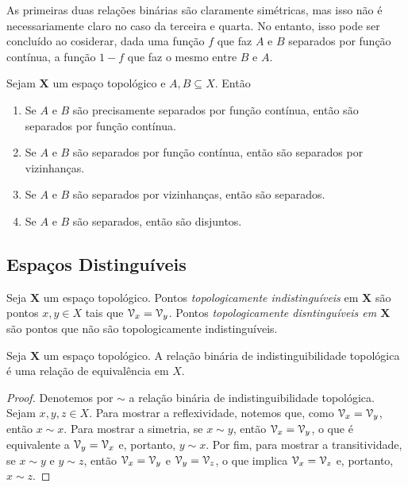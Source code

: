 	As primeiras duas relações binárias são claramente simétricas, mas isso não é necessariamente claro no caso da terceira e quarta. No entanto, isso pode ser concluído ao cosiderar, dada uma função $f$ que faz $A$ e $B$ separados por função contínua, a função $1-f$ que faz o mesmo entre $B$ e $A$.

\begin{prop}
\label{topo:prop.separacao}
Sejam $\bm X$ um espaço topológico e $A,B \subseteq X$. Então
	\begin{enumerate}
	\item Se $A$ e $B$ são precisamente separados por função contínua, então são separados por função contínua.
	\item Se $A$ e $B$ são separados por função contínua, então são separados por vizinhanças.
	\item Se $A$ e $B$ são separados por vizinhanças, então são separados.
	\item Se $A$ e $B$ são separados, então são disjuntos.
	\end{enumerate}
\end{prop}



\subsection{Espaços Distinguíveis}

\begin{defi}
Seja $\bm X$ um espaço topológico. Pontos \emph{topologicamente indistinguíveis} em $\bm X$ são pontos $x,y \in X$ tais que $\mathcal{V}_x = \mathcal{V}_y$. Pontos \emph{topologicamente disntinguíveis em $\bm X$} são pontos que não são topologicamente indistinguíveis.
\end{defi}

\begin{prop}
Seja $\bm X$ um espaço topológico. A relação binária de indistinguibilidade topológica é uma relação de equivalência em $X$.
\end{prop}
\begin{proof}
Denotemos por $\sim$ a relação binária de indistinguibilidade topológica. Sejam $x,y,z \in X$. Para mostrar a reflexividade, notemos que, como $\mathcal{V}_x=\mathcal{V}_y$, então $x \sim x$. Para mostrar a simetria, se $x \sim y$, então $\mathcal{V}_x=\mathcal{V}_y$, o que é equivalente a $\mathcal{V}_y=\mathcal{V}_x$ e, portanto, $y \sim x$. Por fim, para mostrar a transitividade, se $x \sim y$ e $y \sim z$, então $\mathcal{V}_x=\mathcal{V}_y$ e $\mathcal{V}_y=\mathcal{V}_z$, o que implica $\mathcal{V}_x=\mathcal{V}_z$ e, portanto, $x \sim z$.
\end{proof}

